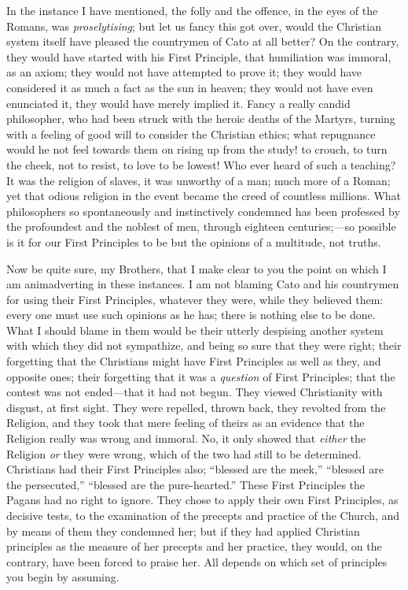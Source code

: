 In the instance I have mentioned, the folly and the
offence, in the eyes of the Romans, was \emph{proselytising};
but let us fancy this got over, would the Christian
system itself have pleased the countrymen of Cato at all
better? On the contrary, they would have started with his
First Principle, that humiliation was immoral, as an
axiom; they would not have attempted to prove it; they
would have considered it as much a fact as the sun in
heaven; they would not have even enunciated it, they
would have merely implied it. Fancy a really candid
philosopher, who had been struck with the heroic deaths
of the Martyrs, turning with a feeling of good will to
consider the Christian ethics; what repugnance would he
not feel towards them on rising up from the study! to
crouch, to turn the cheek, not to resist, to love to be
lowest! Who ever heard of such a teaching? It was the
religion of slaves, it was unworthy of a man; much more
of a Roman; yet that odious religion in the event became
the creed of countless millions. What philosophers so
spontaneously and instinctively condemned has been
professed by the profoundest and the noblest of men,
through eighteen centuries;—so possible is it for
our First Principles to be but the opinions of a
multitude, not truths.

Now be quite sure, my Brothers, that I make clear to
you the point on which I am animadverting in these
instances. I am not blaming Cato and his countrymen for
using their First Principles, whatever they were, while
they believed them: every one must use such opinions as
he has; there is nothing else to be done. What I should
blame in them would be their utterly despising another
system with which they did not sympathize, and being so
sure that they were right; their forgetting that the
Christians might have First Principles as well as they,
and opposite ones; their forgetting that it was a \emph{question}
of First Principles; that the contest was not
ended—that it had not begun. They viewed
Christianity with disgust, at first sight. They were
repelled, thrown back, they revolted from the Religion,
and they took that mere feeling of theirs as an evidence
that the Religion really was wrong and immoral. No, it
only showed that \emph{either} the Religion \emph{or}
they were wrong, which of the two had still to be
determined. Christians had their First Principles also;
``blessed are the meek,'' ``blessed are the
persecuted,'' ``blessed are the
pure-hearted.'' These First Principles the Pagans had
no right to ignore. They chose to apply their own First
Principles, as decisive tests, to the examination of the
precepts and practice of the Church, and by means of them
they condemned her; but if they had applied Christian
principles as the measure of her precepts and her
practice, they would, on the contrary, have been forced
to praise her. All depends on which set of principles you
begin by assuming.

